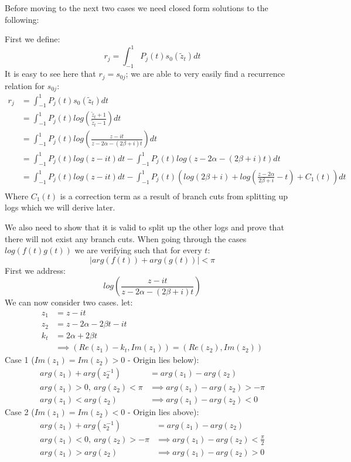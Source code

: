 \documentclass{article}
\begin{document}
Before moving to the next two cases we need closed form solutions to the following:

First we define: $$r_j = \int_{-1}^1P_j(t)s_0(\tilde{z}_t)dt$$
It is easy to see here that $r_j = s_{0j}$; we are able to very easily find a recurrence relation for $s_{0j}$:
\begin{align}
    r_j &= \int_{-1}^1P_j(t)s_0(\tilde{z}_t)dt\\
    &=\int_{-1}^1P_j(t)log(\frac{\tilde{z}_t+1}{\tilde{z}_t-1})dt\\
    &=\int_{-1}^1P_j(t)log(\frac{z-it}{z-2\alpha-(2\beta+i)t})dt\\
    &=\int_{-1}^1P_j(t)log(z-it)dt-\int_{-1}^1P_j(t)log(z-2\alpha-(2\beta+i)t)dt\\
    &=\int_{-1}^1P_j(t)log(z-it)dt
    -\int_{-1}^1P_j(t)(log(2\beta+i)+log(\frac{z-2\alpha}{2\beta+i}-t)+C_1(t))dt\\
\end{align}
Where $C_1(t)$ is a correction term as a result of branch cuts from splitting up logs which we will derive later.

We also need to show that it is valid to split up the other logs and prove that there will not exist any branch cuts.
When going through the cases $log(f(t)g(t))$ we are verifying such that for every $t$:
$$|arg(f(t))+arg(g(t))|<\pi$$
First we address:
$$log(\frac{z-it}{z-2\alpha-(2\beta+i)t})$$
We can now consider two cases.
let:
\begin{align}
    z_1&=z-it\\
    z_2&=z-2\alpha-2\beta t-it\\
    k_t&=2\alpha+2\beta t\\
    &\implies (Re(z_1)-k_t, Im(z_1))=(Re(z_2), Im(z_2))
\end{align}
Case 1 ($Im(z_1)=Im(z_2)>0$ - Origin lies below):
\begin{align}
    arg(z_1)+arg(z_2^{-1})&=arg(z_1)-arg(z_2)\\
    arg(z_1)>0,\:arg(z_2)<\pi&\implies arg(z_1)-arg(z_2)>-\pi\\
    arg(z_1)<arg(z_2)&\implies arg(z_1)-arg(z_2)<0
\end{align}
Case 2 ($Im(z_1)=Im(z_2)<0$ - Origin lies above):
\begin{align}
    arg(z_1)+arg(z_2^{-1})&=arg(z_1)-arg(z_2)\\
    arg(z_1)<0,\:arg(z_2)>-\pi&\implies arg(z_1)-arg(z_2)<\frac{\pi}{2}\\
    arg(z_1)>arg(z_2)&\implies arg(z_1)-arg(z_2)>0
\end{align}
\end{document}
